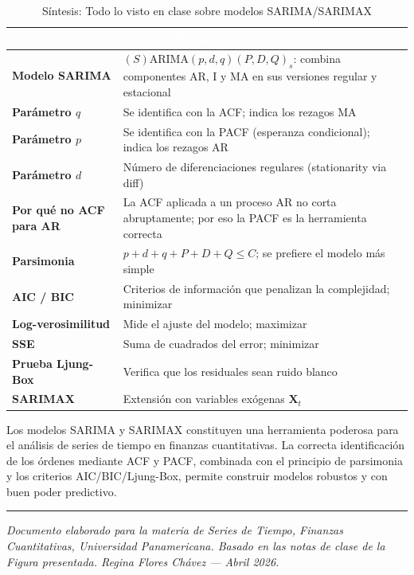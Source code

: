 \documentclass[12pt,a4paper]{article}
\begin{document}
\begin{table}[H]
  \centering
  \caption{Síntesis: Todo lo visto en clase sobre modelos SARIMA/SARIMAX}
  \label{tab:resumen}
  \begin{tabular}{>{\bfseries\color{upnavy}}p{3.5cm} p{10cm}}
    \toprule
    \rowcolor{upnavy}
    \textcolor{white}{Concepto} & \textcolor{white}{Descripción clave} \\
    \midrule
    Modelo SARIMA & $(S)$ARIMA$(p,d,q)(P,D,Q)_s$: combina componentes AR, I y MA
      en sus versiones regular y estacional \\
    Parámetro $q$ & Se identifica con la ACF; indica los rezagos MA \\
    Parámetro $p$ & Se identifica con la PACF (esperanza condicional); indica los rezagos AR \\
    Parámetro $d$ & Número de diferenciaciones regulares (stationarity via diff) \\
    Por qué no ACF para AR & La ACF aplicada a un proceso AR no corta abruptamente;
      por eso la PACF es la herramienta correcta \\
    Parsimonia & $p+d+q+P+D+Q \leq C$; se prefiere el modelo más simple \\
    AIC / BIC & Criterios de información que penalizan la complejidad; minimizar \\
    Log-verosimilitud & Mide el ajuste del modelo; maximizar \\
    SSE & Suma de cuadrados del error; minimizar \\
    Prueba Ljung-Box & Verifica que los residuales sean ruido blanco \\
    SARIMAX & Extensión con variables exógenas $\mathbf{X}_t$ \\
    \bottomrule
  \end{tabular}
\end{table}

Los modelos SARIMA y SARIMAX constituyen una herramienta poderosa para el análisis
de series de tiempo en finanzas cuantitativas. La correcta identificación de los
órdenes mediante ACF y PACF, combinada con el principio de parsimonia y los criterios
AIC/BIC/Ljung-Box, permite construir modelos robustos y con buen poder predictivo.

\vspace{1cm}
\hrule
\vspace{0.4cm}
{\small\textit{Documento elaborado para la materia de Series de Tiempo, Finanzas Cuantitativas,
Universidad Panamericana. Basado en las notas de clase de la Figura presentada.
Regina Flores Chávez --- Abril 2026.}}
\end{document}
